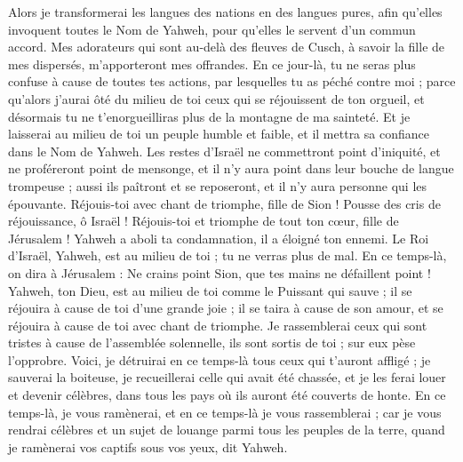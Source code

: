 \begin{multicols}{2}
Alors je transformerai les langues des nations en des langues pures, afin qu'elles invoquent toutes le Nom de Yahweh, pour qu'elles le servent d'un commun accord.
Mes adorateurs qui sont au-delà des fleuves de Cusch, à savoir la fille de mes dispersés, m'apporteront mes offrandes.
En ce jour-là, tu ne seras plus confuse à cause de toutes tes actions, par lesquelles tu as péché contre moi ; parce qu'alors j'aurai ôté du milieu de toi ceux qui se réjouissent de ton orgueil, et désormais tu ne t'enorgueilliras plus de la montagne de ma sainteté.
Et je laisserai au milieu de toi un peuple humble et faible, et il mettra sa confiance dans le Nom de Yahweh.
Les restes d'Israël ne commettront point d'iniquité, et ne proféreront point de mensonge, et il n'y aura point dans leur bouche de langue trompeuse ; aussi ils paîtront et se reposeront, et il n'y aura personne qui les épouvante.
Réjouis-toi avec chant de triomphe, fille de Sion ! Pousse des cris de réjouissance, ô Israël ! Réjouis-toi et triomphe de tout ton cœur, fille de Jérusalem !
Yahweh a aboli ta condamnation, il a éloigné ton ennemi. Le Roi d'Israël, Yahweh, est au milieu de toi ; tu ne verras plus de mal.
En ce temps-là, on dira à Jérusalem : Ne crains point Sion, que tes mains ne défaillent point !
Yahweh, ton Dieu, est au milieu de toi comme le Puissant qui sauve ; il se réjouira à cause de toi d'une grande joie ; il se taira à cause de son amour, et se réjouira à cause de toi avec chant de triomphe.
Je rassemblerai ceux qui sont tristes à cause de l'assemblée solennelle, ils sont sortis de toi ; sur eux pèse l'opprobre.
Voici, je détruirai en ce temps-là tous ceux qui t'auront affligé ; je sauverai la boiteuse, je recueillerai celle qui avait été chassée, et je les ferai louer et devenir célèbres, dans tous les pays où ils auront été couverts de honte.
En ce temps-là, je vous ramènerai, et en ce temps-là je vous rassemblerai ; car je vous rendrai célèbres et un sujet de louange parmi tous les peuples de la terre, quand je ramènerai vos captifs sous vos yeux, dit Yahweh.
\PPE{}
\end{multicols}
